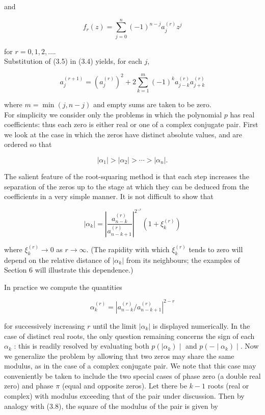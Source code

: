 \documentclass[10pt]{article}
\begin{document}
and


\begin{equation*}
f_{r}(z)=\sum_{j=0}^{n}(-1)^{n-j} a_{j}^{(r)} z^{j} \tag{3.5}
\end{equation*}


for $r=0,1,2, \ldots$.\\
Substitution of (3.5) in (3.4) yields, for each $j$,


\begin{equation*}
a_{j}^{(r+1)}=\left(a_{j}^{(r)}\right)^{2}+2 \sum_{k=1}^{m}(-1)^{k} a_{j-k}^{(r)} a_{j+k}^{(r)} \tag{3.6}
\end{equation*}


where $m=\min (j, n-j)$ and empty sums are taken to be zero.\\
For simplicity we consider only the problems in which the polynomial $p$ has real coefficients: thus each zero is either real or one of a complex conjugate pair. First we look at the case in which the zeros have distinct absolute values, and are ordered so that


\begin{equation*}
\left|\alpha_{1}\right|>\left|\alpha_{2}\right|>\cdots>\left|\alpha_{n}\right| . \tag{3.7}
\end{equation*}


The salient feature of the root-squaring method is that each step increases the separation of the zeros up to the stage at which they can be deduced from the coefficients in a very simple manner. It is not difficult to show that


\begin{equation*}
\left|\alpha_{k}\right|=\left|\frac{a_{n-k}^{(r)}}{a_{n-k+1}^{(r)}}\right|^{2^{-r}}\left(1+\xi_{k}^{(r)}\right) \tag{3.8}
\end{equation*}


where $\xi_{k}^{(r)} \rightarrow 0$ as $r \rightarrow \infty$. (The rapidity with which $\xi_{k}^{(r)}$ tends to zero will depend on the relative distance of $\left|\alpha_{k}\right|$ from its neighbours; the examples of Section 6 will illustrate this dependence.)

In practice we compute the quantities


\begin{equation*}
\alpha_{k}^{(r)}=\left|a_{n-k}^{(r)} / a_{n-k+1}^{(r)}\right|^{2-r} \tag{3.9}
\end{equation*}


for successively increasing $r$ until the limit $\left|\alpha_{k}\right|$ is displayed numerically. In the case of distinct real roots, the only question remaining concerns the sign of each $\alpha_{k}$ : this is readily resolved by evaluating both $p\left(\mid \alpha_{k}\right) \mid$ and $p\left(-\mid \alpha_{k}\right) \mid$. Now we generalize the problem by allowing that two zeros may share the same modulus, as in the case of a complex conjugate pair. We note that this case may conveniently be taken to include the two special cases of phase zero (a double real zero) and phase $\pi$ (equal and opposite zeros). Let there be $k-1$ roots (real or complex) with modulus exceeding that of the pair under discussion. Then by analogy with (3.8), the square of the modulus of the pair is given by
\end{document}

